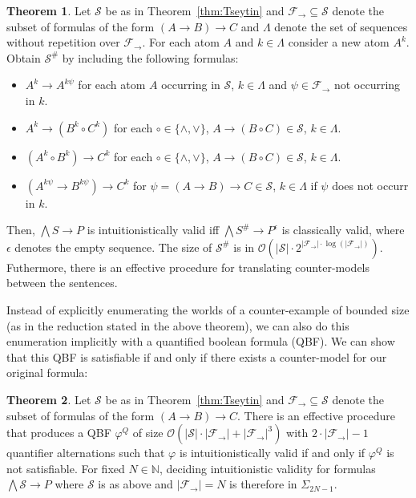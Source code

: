 \documentclass[a4paper,11pt]{report}
\theoremstyle{definition}
\newtheorem{theorem}{Theorem}[section]
\theoremstyle{definition}
\theoremstyle{definition}
\theoremstyle{definition}
\theoremstyle{definition}
\theoremstyle{definition}
\theoremstyle{definition}
\begin{document}
	\begin{theorem}
		\label{thm:reduction-propositional}
		Let $\mathcal S$ be as in Theorem~\ref{thm:Tseytin} and $\mathcal F_\to\subseteq\mathcal S$ denote the subset of formulas of the form $(A\to B)\to C$ and $\Lambda$ denote the set of sequences without repetition over $\mathcal F_\to$. For each atom $A$ and $k\in\Lambda$ consider a new atom $A^k$. Obtain $\mathcal S^\#$ by including the following formulas:
		\begin{itemize}
			\item $A^k\to A^{k\psi}$ for each atom $A$ occurring in $\mathcal S$, $k\in\Lambda$ and $\psi\in\mathcal F_\to$ not occurring in $k$.
			\item $A^k\to (B^k\circ C^k)$ for each $\circ\in\{\wedge,\vee\}$, $A\to (B\circ C)\in\mathcal S$, $k\in\Lambda$.
			\item $(A^k\circ B^k)\to C^k$ for each $\circ\in\{\wedge,\vee\}$, $A\to (B\circ C)\in\mathcal S$, $k\in\Lambda$.
			\item $(A^{k\psi}\to B^{k\psi})\to C^k$ for $\psi = (A\to B)\to C\in\mathcal S$, $k\in\Lambda$ if $\psi$ does not occurr in $k$.
		\end{itemize}
		Then, $\bigwedge S\to P$ is intuitionistically valid iff $\bigwedge S^\#\to P^\epsilon$ is classically valid, where $\epsilon$ denotes the empty sequence. The size of $\mathcal S^\#$ is in $\mathcal O(|\mathcal S|\cdot2^{|\mathcal F_\to|\cdot\log(|\mathcal F_\to|)})$. Futhermore, there is an effective procedure for translating counter-models between the sentences.
	\end{theorem}
	
	Instead of explicitly enumerating the worlds of a counter-example of bounded size (as in the reduction stated in the above theorem), we can also do this enumeration implicitly with a quantified boolean formula (QBF).
	We can show that this QBF is satisfiable if and only if there exists a counter-model for our original formula:
	
	\begin{theorem}
		Let $\mathcal S$ be as in Theorem~\ref{thm:Tseytin} and $\mathcal F_\to\subseteq\mathcal S$ denote the subset of formulas of the form $(A\to B)\to C$. There is an effective procedure that produces a QBF $\varphi^Q$ of size $\mathcal O(|\mathcal S|\cdot|\mathcal F_\to| + |\mathcal F_\to|^3)$ with $2\cdot |\mathcal F_\to|-1$ quantifier alternations such that $\varphi$ is intuitionistically valid if and only if $\varphi^Q$ is not satisfiable. For fixed $N\in\mathbb N$, deciding intuitionistic validity for formulas $\bigwedge \mathcal S\to P$ where $\mathcal S$ is as above and $|\mathcal F_\to| = N$ is therefore in $\Sigma_{2N-1}$.
	\end{theorem}
	
\end{document}
